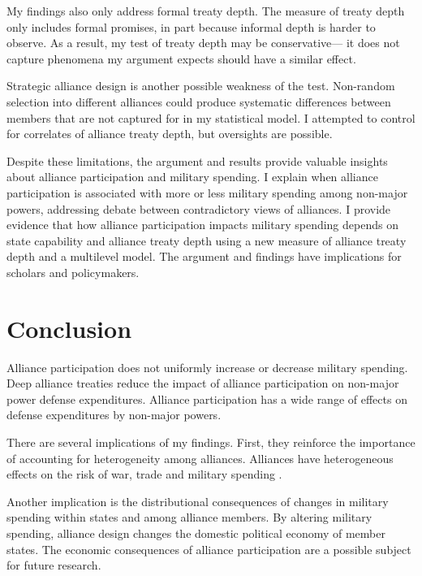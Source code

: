 \documentclass[12pt]{article}
\begin{document}
My findings also only address formal treaty depth. 
The measure of treaty depth only includes formal promises, in part because informal depth is harder to observe. 
As a result, my test of treaty depth may be conservative--- it does not capture phenomena my argument expects should have a similar effect. 


Strategic alliance design is another possible weakness of the test. 
Non-random selection into different alliances could produce systematic differences between members that are not captured for in my statistical model. 
I attempted to control for correlates of alliance treaty depth, but oversights are possible.


Despite these limitations, the argument and results provide valuable insights about alliance participation and military spending. 
I explain when alliance participation is associated with more or less military spending among non-major powers, addressing debate between contradictory views of alliances.  
I provide evidence that how alliance participation impacts military spending depends on state capability and alliance treaty depth using a new measure of alliance treaty depth and a multilevel model. 
The argument and findings have implications for scholars and policymakers. 


\section{Conclusion}

Alliance participation does not uniformly increase or decrease military spending. 
Deep alliance treaties reduce the impact of alliance participation on non-major power defense expenditures. 
Alliance participation has a wide range of effects on defense expenditures by non-major powers. 


There are several implications of my findings.  
First, they reinforce the importance of accounting for heterogeneity among alliances.
Alliances have heterogeneous effects on the risk of war, trade and military spending \citep{Leeds2003, LongLeeds2006, Benson2012, DigiuseppePoast2016}. 


Another implication is the distributional consequences of changes in military spending within states and among alliance members.  
By altering military spending, alliance design changes the domestic political economy of member states. 
The economic consequences of alliance participation are a possible subject for future research. 
\end{document}
